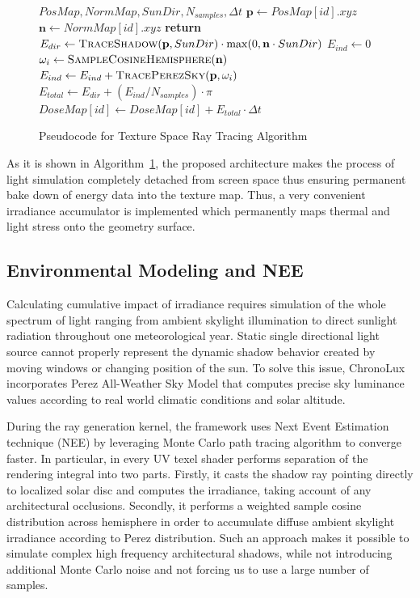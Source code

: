 \documentclass[conference]{IEEEtran}
\begin{document}
\begin{figure}[htbp]
    \begin{algorithmic}
        \REQUIRE $PosMap, NormMap, SunDir, N_{samples}, \Delta t$
        \STATE $\mathbf{p} \leftarrow PosMap[id].xyz$
        \STATE $\mathbf{n} \leftarrow NormMap[id].xyz$
        \STATE \textbf{return}
        \ENDIF
        \STATE $E_{dir} \leftarrow \textsc{TraceShadow}(\mathbf{p}, SunDir) \cdot \max(0, \mathbf{n} \cdot SunDir)$
        \STATE $E_{ind} \leftarrow 0$
        \STATE $\omega_i \leftarrow \textsc{SampleCosineHemisphere}(\mathbf{n})$
        \STATE $E_{ind} \leftarrow E_{ind} + \textsc{TracePerezSky}(\mathbf{p}, \omega_i)$
        \ENDFOR
        \STATE $E_{total} \leftarrow E_{dir} + (E_{ind} / N_{samples}) \cdot \pi$
        \STATE $DoseMap[id] \leftarrow DoseMap[id] + E_{total} \cdot \Delta t$
        \ENDFOR
    \end{algorithmic}
    \caption{Pseudocode for Texture Space Ray Tracing Algorithm}
    \label{alg:ts_raytrace}
\end{figure}

As it is shown in Algorithm~\ref{alg:ts_raytrace}, the proposed architecture makes the process of light simulation completely detached from screen space thus ensuring permanent bake down of energy data into the texture map. Thus, a very convenient irradiance accumulator is implemented which permanently maps thermal and light stress onto the geometry surface.

\subsection{Environmental Modeling and NEE}

Calculating cumulative impact of irradiance requires simulation of the whole spectrum of light ranging from ambient skylight illumination to direct sunlight radiation throughout one meteorological year. Static single directional light source cannot properly represent the dynamic shadow behavior created by moving windows or changing position of the sun. To solve this issue, ChronoLux incorporates Perez All-Weather Sky Model \cite{perez1993all} that computes precise sky luminance values according to real world climatic conditions and solar altitude.

During the ray generation kernel, the framework uses Next Event Estimation technique (NEE) by leveraging Monte Carlo path tracing algorithm to converge faster. In particular, in every UV texel shader performs separation of the rendering integral into two parts. Firstly, it casts the shadow ray pointing directly to localized solar disc and computes the irradiance, taking account of any architectural occlusions. Secondly, it performs a weighted sample cosine distribution across hemisphere in order to accumulate diffuse ambient skylight irradiance according to Perez distribution. Such an approach makes it possible to simulate complex high frequency architectural shadows, while not introducing additional Monte Carlo noise and not forcing us to use a large number of samples.
\end{document}

